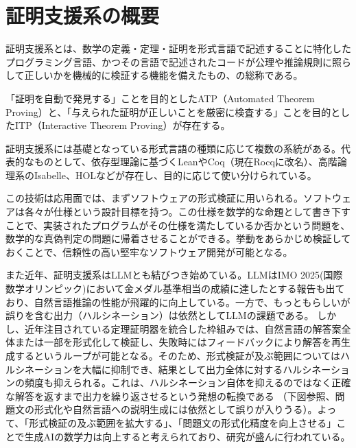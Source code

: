 \documentclass[a4paper,12pt]{bxjsbook}
\newlength{\customindent}
\newenvironment{body}{
  \par
  \begingroup
  \setlength{\leftskip}{\customindent}
  \setlength{\rightskip}{0pt}
  \setlength{\parindent}{1em}
  \setlength{\displayindent}{\customindent}
  \setlength{\displaywidth}{\dimexpr\linewidth-\customindent\relax}
}{
  \par
  \endgroup
}
\theoremstyle{theorem}
\begin{document}
    \section{証明支援系の概要}
    \begin{body}
        \indent 証明支援系とは、数学の定義・定理・証明を形式言語で記述することに特化したプログラミング言語、かつその言語で記述されたコードが公理や推論規則に照らして正しいかを機械的に検証する機能を備えたもの、の総称である。
        
        \indent 「証明を自動で発見する」ことを目的としたATP（Automated Theorem Proving）と、「与えられた証明が正しいことを厳密に検査する」ことを目的としたITP（Interactive Theorem Proving）が存在する。

        \indent 証明支援系には基礎となっている形式言語の種類に応じて複数の系統がある。代表的なものとして、依存型理論に基づくLeanやCoq（現在Rocqに改名）、高階論理系のIsabelle、HOLなどが存在し、目的に応じて使い分けられている。

        \indent この技術は応用面では、まずソフトウェアの形式検証に用いられる。ソフトウェアは各々が仕様という設計目標を持つ。この仕様を数学的な命題として書き下すことで、実装されたプログラムがその仕様を満たしているか否かという問題を、数学的な真偽判定の問題に帰着させることができる。挙動をあらかじめ検証しておくことで、信頼性の高い堅牢なソフトウェア開発が可能となる。

        \indent また近年、証明支援系はLLMとも結びつき始めている。LLMはIMO 2025(国際数学オリンピック)において金メダル基準相当の成績に達したとする報告も出ており\cite{DeepMindIMO2025}、自然言語推論の性能が飛躍的に向上している。一方で、もっともらしいが誤りを含む出力（ハルシネーション）は依然としてLLMの課題である。
        しかし、近年注目されている定理証明器を統合した枠組みでは、自然言語の解答案全体または一部を形式化して検証し、失敗時にはフィードバックにより解答を再生成するというループが可能となる。そのため、形式検証が及ぶ範囲についてはハルシネーションを大幅に抑制でき、結果として出力全体に対するハルシネーションの頻度も抑えられる。これは、ハルシネーション自体を抑えるのではなく正確な解答を返すまで出力を繰り返させるという発想の転換である
        （下図参照、問題文の形式化や自然言語への説明生成には依然として誤りが入りうる）。よって、「形式検証の及ぶ範囲を拡大する」、「問題文の形式化精度を向上させる」ことで生成AIの数学力は向上すると考えられており、研究が盛んに行われている。

    \end{body}
\end{document}
